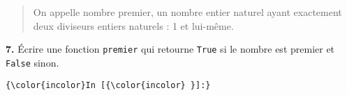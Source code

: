 \documentclass[11pt]{article}
\begin{document}
\begin{quote}
On appelle nombre premier, un nombre entier naturel ayant exactement
deux diviseurs entiers naturels : 1 et lui-même.
\end{quote}

    \textbf{7.} Écrire une fonction \texttt{premier} qui retourne
\texttt{True} si le nombre est premier et \texttt{False} sinon.

    \begin{Verbatim}[commandchars=\\\{\}]
{\color{incolor}In [{\color{incolor} }]:} 
\end{Verbatim}


    
    
    
    
\end{document}
